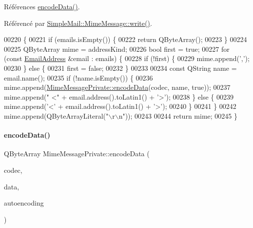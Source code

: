 Références \hyperlink{class_simple_mail_1_1_mime_message_private_ae036b2417205ef25181091bebd15c0f6}{encode\+Data()}.



Référencé par \hyperlink{class_simple_mail_1_1_mime_message_ae7fff977d1c558ddc6711416fe0ff723}{Simple\+Mail\+::\+Mime\+Message\+::write()}.


\begin{DoxyCode}
00220 \{
00221     \textcolor{keywordflow}{if} (emails.isEmpty()) \{
00222         \textcolor{keywordflow}{return} QByteArray();
00223     \}
00224 
00225     QByteArray mime = addressKind;
00226     \textcolor{keywordtype}{bool} first = \textcolor{keyword}{true};
00227     \textcolor{keywordflow}{for} (\textcolor{keyword}{const} \hyperlink{class_simple_mail_1_1_email_address}{EmailAddress} &email : emails) \{
00228         \textcolor{keywordflow}{if} (!first) \{
00229             mime.append(\textcolor{charliteral}{','});
00230         \} \textcolor{keywordflow}{else} \{
00231             first = \textcolor{keyword}{false};
00232         \}
00233 
00234         \textcolor{keyword}{const} QString name = email.name();
00235         \textcolor{keywordflow}{if} (!name.isEmpty()) \{
00236             mime.append(\hyperlink{class_simple_mail_1_1_mime_message_private_ae036b2417205ef25181091bebd15c0f6}{MimeMessagePrivate::encodeData}(codec, name, \textcolor{keyword}{true}));
00237             mime.append(\textcolor{stringliteral}{" <"} + email.address().toLatin1() + \textcolor{charliteral}{'>'});
00238         \} \textcolor{keywordflow}{else} \{
00239             mime.append(\textcolor{charliteral}{'<'} + email.address().toLatin1() + \textcolor{charliteral}{'>'});
00240         \}
00241     \}
00242     mime.append(QByteArrayLiteral(\textcolor{stringliteral}{"\(\backslash\)r\(\backslash\)n"}));
00243 
00244     \textcolor{keywordflow}{return} mime;
00245 \}
\end{DoxyCode}
\mbox{\label{class_simple_mail_1_1_mime_message_private_ae036b2417205ef25181091bebd15c0f6}} 
\paragraph{\texorpdfstring{encode\+Data()}{encodeData()}}
{\footnotesize\ttfamily Q\+Byte\+Array Mime\+Message\+Private\+::encode\+Data (\begin{DoxyParamCaption}\item[{\hyperlink{class_simple_mail_1_1_mime_part_ae67a2f5406958b95b18bf31a7bbeb5c9}{Mime\+Part\+::\+Encoding}}]{codec,  }\item[{const Q\+String \&}]{data,  }\item[{bool}]{autoencoding }\end{DoxyParamCaption})\hspace{0.3cm}{\ttfamily [static]}}



